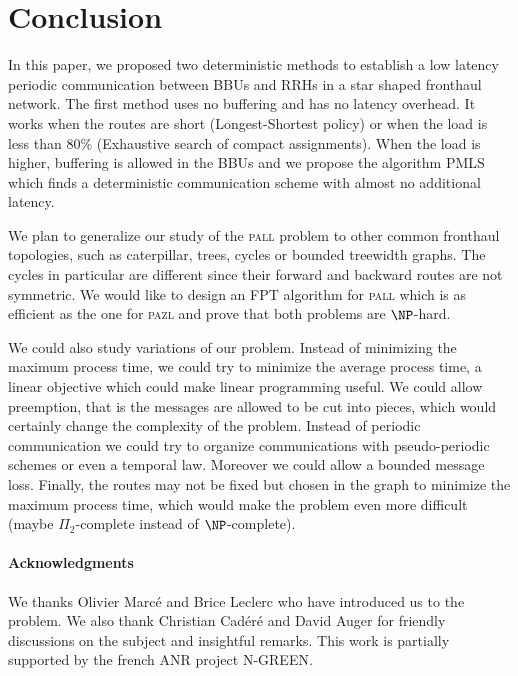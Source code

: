 \documentclass[10pt, conference, letterpaper]{IEEEtran}
\newcommand\pazl{\textsc{pazl}\xspace}
\newcommand\pall{\textsc{pall}\xspace}
\begin{document}
 \section{Conclusion}
In this paper, we proposed two deterministic methods to establish a low latency periodic communication between BBUs and RRHs in a star shaped fronthaul network. The first method uses no buffering and has no latency overhead. It works when the routes are short (Longest-Shortest policy) or when the load is less than $80\%$ (Exhaustive search of compact assignments).  
When the load is higher, buffering is allowed in the BBUs and we propose the algorithm PMLS which  finds a deterministic communication scheme with almost no additional latency.
% 

   
   We plan to generalize our study of the \pall problem to other common fronthaul topologies,
   such as caterpillar, trees, cycles or bounded treewidth graphs. The cycles in particular are 
   different since their forward and backward routes are not symmetric. 
   We would like to design an FPT algorithm for \pall which is as efficient as the one for \pazl 
   and prove that both problems are $\NP$-hard.

   We could also study variations of our problem. Instead of minimizing the maximum process time, we could try to minimize the average process time, a linear objective which could make linear programming useful. We could allow preemption, that is the messages are allowed to be cut into pieces, which would certainly change the complexity of the problem.  Instead of periodic communication we could try to organize communications with pseudo-periodic schemes or even a temporal law. Moreover we could allow a bounded message loss.
   Finally, the routes may not be fixed but chosen in the graph to minimize the maximum process time, which would make the problem even more difficult (maybe $\Pi_2$-complete instead of $\NP$-complete). 

  
 \paragraph*{Acknowledgments} 
 We thanks Olivier Marcé and Brice Leclerc who have introduced us to the problem.
 We also thank Christian Cad\'er\'e and David Auger for friendly discussions on the subject and insightful remarks. This work is partially supported by the french ANR project N-GREEN.



\end{document}
